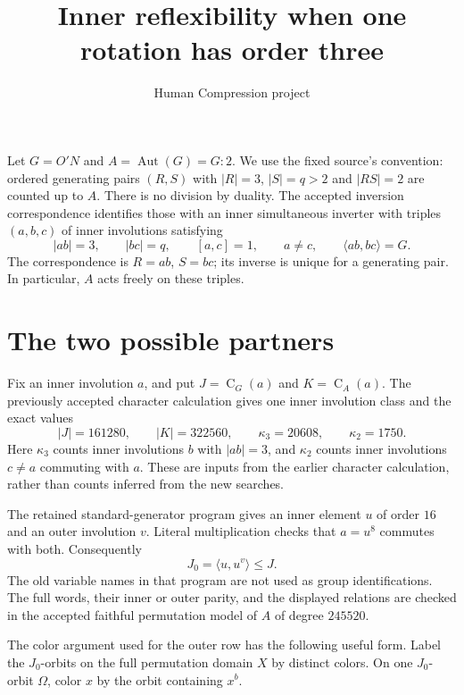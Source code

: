 \documentclass[11pt,a4paper]{article}
\title{Inner reflexibility when one rotation has order three}
\author{Human Compression project}\date{}
\newcommand{\Aut}{\operatorname{Aut}}
\newcommand{\C}{\operatorname{C}}
\begin{document}
\maketitle
Let $G=O'N$ and $A=\Aut(G)=G{:}2$. We use the fixed source's convention:
ordered generating pairs $(R,S)$ with $|R|=3$, $|S|=q>2$ and $|RS|=2$
are counted up to $A$. There is no division by duality. The accepted
inversion correspondence identifies those with an inner simultaneous
inverter with triples $(a,b,c)$ of inner involutions satisfying
\[
 |ab|=3,\qquad |bc|=q,\qquad [a,c]=1,\qquad a\ne c,
 \qquad \langle ab,bc\rangle=G.
\]
The correspondence is $R=ab$, $S=bc$; its inverse is unique for a
generating pair. In particular, $A$ acts freely on these triples.

\section{The two possible partners}
Fix an inner involution $a$, and put $J=\C_G(a)$ and $K=\C_A(a)$.
The previously accepted character calculation gives one inner involution
class and the exact values
\[
 |J|=161280,\qquad |K|=322560,\qquad
 \kappa_3=20608,\qquad \kappa_2=1750.
\]
Here $\kappa_3$ counts inner involutions $b$ with $|ab|=3$, and
$\kappa_2$ counts inner involutions $c\ne a$ commuting with $a$.
These are inputs from the earlier character calculation, rather than
counts inferred from the new searches.

The retained standard-generator program gives an inner element $u$ of
order $16$ and an outer involution $v$. Literal multiplication checks
that $a=u^8$ commutes with both. Consequently
\[
 J_0=\langle u,u^v\rangle\le J.
\]
The old variable names in that program are not used as group
identifications. The full words, their inner or outer parity, and the
displayed relations are checked in the accepted faithful permutation
model of $A$ of degree $245520$.

The color argument used for the outer row has the following useful
form. Label the $J_0$-orbits on the full permutation domain $X$ by
distinct colors. On one $J_0$-orbit $\Omega$, color $x$ by the orbit
containing $x^b$.
\end{document}

